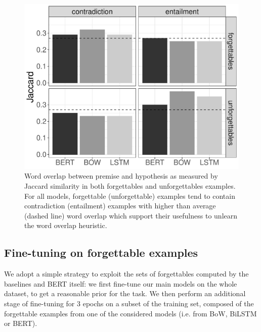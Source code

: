\begin{figure}[t]
\centering
  \includegraphics[scale=0.45]{figures/jaccard_plot.pdf}
  \caption{Word overlap between premise and hypothesis as measured by Jaccard similarity in both forgettables and unforgettables examples. For all models, forgettable (unforgettable) examples tend to contain contradiction (entailment) examples with higher than average (dashed line) word overlap which support their usefulness to unlearn the word overlap heuristic. }
\label{fig:wordoverlap-unforg}
\end{figure}

\subsection{Fine-tuning on forgettable examples}
\label{sec:fine_tune}
We adopt a simple strategy to exploit the sets of forgettables computed by the baselines and BERT itself: we first fine-tune our main models on the whole dataset, to get a reasonable prior for the task. We then perform an additional stage of fine-tuning for $3$ epochs on a subset of the training set, composed of the forgettable examples from one of the considered models (i.e. from BoW, BiLSTM or BERT).


